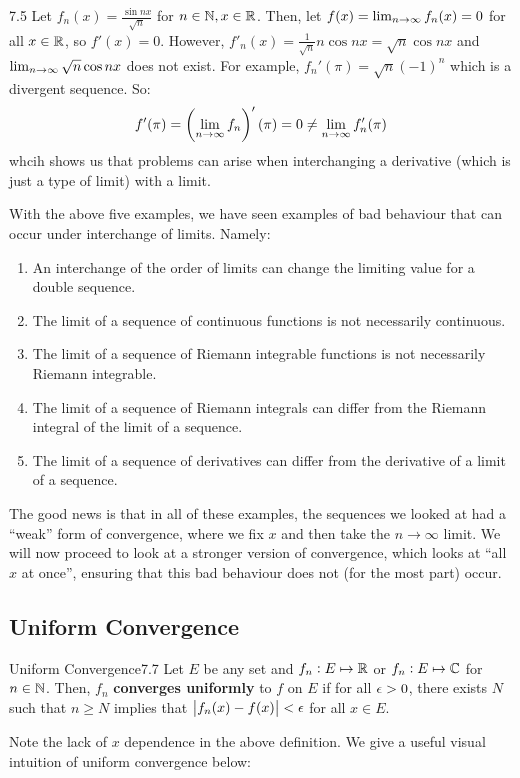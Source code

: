 \begin{example}{}{7.5}
    Let $f_n(x) = \frac{\sin nx}{\sqrt{n}}$ for $n \in \mathbb{N}, x \in \mathbb{R}$. Then, let $f(x) = \lim_{n \rightarrow \infty} f_n(x) = 0$ for all $x \in \mathbb{R}$, so $f'(x) = 0$. However, $f'_n(x) = \frac{1}{\sqrt{n}}n \cos n x = \sqrt{n} \cos n x$ and $\lim_{n \rightarrow \infty} \sqrt{n} \cos n x$ does not exist. For example, $f_n'(\pi) = \sqrt{n}(-1)^n$ which is a divergent sequence. So:
    \begin{align*}
        f'(\pi) = \left(\lim_{n \rightarrow \infty} f_n\right)'(\pi) = 0 \neq \lim_{n \rightarrow \infty} f_n'(\pi)
    \end{align*}
    whcih shows us that problems can arise when interchanging a derivative (which is just a type of limit) with a limit.
\end{example}
\noindent With the above five examples, we have seen examples of bad behaviour that can occur under interchange of limits. Namely:
\begin{enumerate}[1.]
    \item An interchange of the order of limits can change the limiting value for a double sequence.
    \item The limit of a sequence of continuous functions is not necessarily continuous.
    \item The limit of a sequence of Riemann integrable functions is not necessarily Riemann integrable.
    \item The limit of a sequence of Riemann integrals can differ from the Riemann integral of the limit of a sequence.
    \item The limit of a sequence of derivatives can differ from the derivative of a limit of a sequence.
\end{enumerate}

\noindent The good news is that in all of these examples, the sequences we looked at had a ``weak'' form of convergence, where we fix $x$ and then take the $n \rightarrow \infty$ limit. We will now proceed to look at a stronger version of convergence, which looks at ``all $x$ at once'', ensuring that this bad behaviour does not (for the most part) occur.

\subsection{Uniform Convergence}

\setcounter{rudin}{6}
\begin{definition}{Uniform Convergence}{7.7}
    Let $E$ be any set and $f_n: E \mapsto \mathbb{R}$ or $f_n: E \mapsto \mathbb{C}$ for $n \in \mathbb{N}$. Then, $f_n$ \textbf{converges uniformly} to $f$ on $E$ if for all $\epsilon > 0$, there exists $N$ such that $n \geq N$ implies that $\abs{f_n(x) - f(x)} < \epsilon$ for all $x \in E$. 
\end{definition}
\noindent Note the lack of $x$ dependence in the above definition. We give a useful visual intuition of uniform convergence below:

